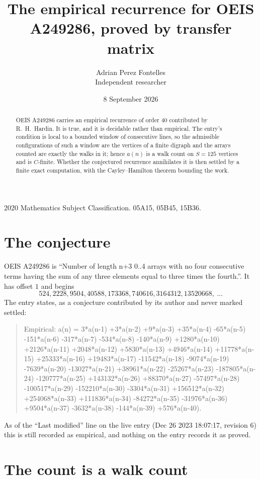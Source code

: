\documentclass[11pt,a4paper]{article}
\title{The empirical recurrence for OEIS A249286, proved by transfer matrix}
\author{Adrian Perez Fontelles\\ \small Independent researcher}
\date{8 September 2026}
\theoremstyle{plain}
\theoremstyle{definition}
\begin{document}
\maketitle

\begin{abstract}
OEIS A249286 carries an empirical recurrence of order $40$ contributed by R.~H.~Hardin. It is
true, and it is decidable rather than empirical. The entry's condition is local to a bounded window of consecutive lines, so
the admissible configurations of such a window are the vertices of a finite digraph and the
arrays counted are exactly the walks in it; hence $a(n)$ is a walk count on $S=125$ vertices
and is $C$-finite. Whether the conjectured recurrence annihilates it is then settled by a
finite exact computation, with the Cayley--Hamilton theorem bounding the work.
\end{abstract}

\noindent\small 2020 Mathematics Subject Classification. 05A15, 05B45, 15B36.\normalsize

\section{The conjecture}

OEIS A249286 is ``Number of length n+3 0..4 arrays with no four consecutive terms having the sum of any three elements equal to three times the fourth.''. It has offset $1$ and begins
\[
524, 2228, 9504, 40588, 173368, 740616, 3164312, 13520668,\ \dots
\]
The entry states, as a conjecture contributed by its author and never marked settled:
\begin{quote}
Empirical: a(n) = 3*a(n-1) +3*a(n-2) +9*a(n-3) +35*a(n-4) -65*a(n-5) -151*a(n-6) -317*a(n-7) -534*a(n-8) -140*a(n-9) +1280*a(n-10) +2126*a(n-11) +2048*a(n-12) +5830*a(n-13) +4946*a(n-14) +11778*a(n-15) +25333*a(n-16) +19483*a(n-17) -11542*a(n-18) -9074*a(n-19) -7639*a(n-20) -13027*a(n-21) +38961*a(n-22) -25267*a(n-23) -187805*a(n-24) -120777*a(n-25) +143132*a(n-26) +88370*a(n-27) -57497*a(n-28) -100517*a(n-29) -152210*a(n-30) -3304*a(n-31) +156512*a(n-32) +254068*a(n-33) +111836*a(n-34) -84272*a(n-35) -31976*a(n-36) +9504*a(n-37) -3632*a(n-38) -144*a(n-39) +576*a(n-40).
\end{quote}
As of the ``Last modified'' line on the live entry (Dec 26 2023 18:07:17, revision 6) this is still
recorded as empirical, and nothing on the entry records it as proved.

\section{The count is a walk count}
\end{document}
